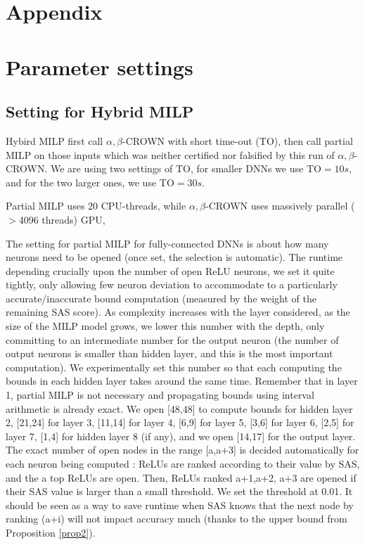 \vspace{-0.6cm}

\section*{Appendix}

\section{Parameter settings}


\subsection*{Setting for Hybrid MILP}


Hybird MILP first call $\alpha,\beta$-CROWN with short time-out (TO), then call partial MILP on those inputs which was neither certified nor falsified by this run of $\alpha,\beta$-CROWN. We are using two settings of TO, for smaller DNNs we use TO$=10s$, and for the two larger ones, we use TO$=30s$.

Partial MILP uses 20 CPU-threads, while $\alpha,\beta$-CROWN uses massively parallel ($>$4096 threads) GPU, 


The setting for partial MILP for fully-connected DNNs is about how many neurons need to be opened (once set, the selection is automatic). The runtime depending crucially upon the number of open ReLU neurons, we set it quite tightly, only allowing few neuron deviation to accommodate to a particularly accurate/inaccurate bound computation (measured by the weight of the remaining SAS score). As complexity increases with the layer considered, as the size of the MILP model grows, we lower this number with the depth, only committing to an intermediate number for the output neuron (the number of output neurons  is smaller than hidden layer, and this is the most important computation). We experimentally set this number so that each computing the bounds in each hidden layer takes around the same time. Remember that in layer 1, partial MILP is not necessary and propagating bounds using interval arithmetic is already exact. We open [48,48] to compute bounds for hidden layer 2, [21,24] for layer 3, [11,14] for layer 4, [6,9] for layer 5, [3,6] for layer 6, [2,5] for layer 7, [1,4] for hidden layer 8 (if any), and we open [14,17] for the output layer.
 The exact number of open nodes in the range [a,a+3] is decided automatically for each neuron being computed : ReLUs are ranked according to their value by SAS, and the a top ReLUs are open. Then, ReLUs ranked a+1,a+2, a+3 are opened if their SAS value is larger than a small threshold. We set the threshold at 0.01. It should be seen as a way to save runtime when SAS knows that the next node by ranking (a+i) will not impact accuracy much (thanks to the upper bound from Proposition \ref{prop2}).

